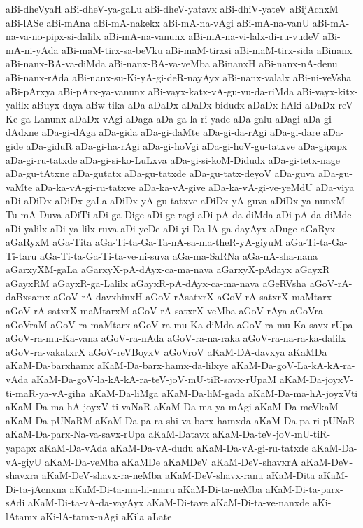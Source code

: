 {aBi-dheVyaH
aBi-dheV-ya-gaLu
aBi-dheV-yatavx
aBi-dhiV-yateV
aBijAcnxM
aBi-lASe
aBi-mAna
aBi-mA-nakekx
aBi-mA-na-vAgi
aBi-mA-na-vanU
aBi-mA-na-va-no-pipx-si-dalilx
aBi-mA-na-vanunx
aBi-mA-na-vi-lalx-di-ru-vudeV
aBi-mA-ni-yAda
aBi-maM-tirx-sa-beVku
aBi-maM-tirxsi
aBi-maM-tirx-sida
aBinanx
aBi-nanx-BA-va-diMda
aBi-nanx-BA-va-veMba
aBinanxH
aBi-nanx-nA-denu
aBi-nanx-rAda
aBi-nanx-su-Ki-yA-gi-deR-nayAyx
aBi-nanx-valalx
aBi-ni-veVsha
aBi-pArxya
aBi-pArx-ya-vanunx
aBi-vayx-katx-vA-gu-vu-da-riMda
aBi-vayx-kitx-yalilx
aBuyx-daya
aBw-tika
aDa
aDaDx
aDaDx-bidudx
aDaDx-hAki
aDaDx-reV-Ke-ga-Lanunx
aDaDx-vAgi
aDaga
aDa-ga-la-ri-yade
aDa-galu
aDagi
aDa-gi-dAdxne
aDa-gi-dAga
aDa-gida
aDa-gi-daMte
aDa-gi-da-rAgi
aDa-gi-dare
aDa-gide
aDa-giduR
aDa-gi-ha-rAgi
aDa-gi-hoVgi
aDa-gi-hoV-gu-tatxve
aDa-gipapx
aDa-gi-ru-tatxde
aDa-gi-si-ko-LuLxva
aDa-gi-si-koM-Didudx
aDa-gi-tetx-nage
aDa-gu-tAtxne
aDa-gutatx
aDa-gu-tatxde
aDa-gu-tatx-deyoV
aDa-guva
aDa-gu-vaMte
aDa-ka-vA-gi-ru-tatxve
aDa-ka-vA-give
aDa-ka-vA-gi-ve-yeMdU
aDa-viya
aDi
aDiDx
aDiDx-gaLa
aDiDx-yA-gu-tatxve
aDiDx-yA-guva
aDiDx-ya-nunxM-Tu-mA-Duva
aDiTi
aDi-ga-Dige
aDi-ge-ragi
aDi-pA-da-diMda
aDi-pA-da-diMde
aDi-yalilx
aDi-ya-lilx-ruva
aDi-yeDe
aDi-yi-Da-lA-ga-dayAyx
aDuge
aGaRyx
aGaRyxM
aGa-Tita
aGa-Ti-ta-Ga-Ta-nA-sa-ma-theR-yA-giyuM
aGa-Ti-ta-Ga-Ti-taru
aGa-Ti-ta-Ga-Ti-ta-ve-ni-suva
aGa-ma-SaRNa
aGa-nA-sha-nana
aGarxyXM-gaLa
aGarxyX-pA-dAyx-ca-ma-nava
aGarxyX-pAdayx
aGayxR
aGayxRM
aGayxR-ga-Lalilx
aGayxR-pA-dAyx-ca-ma-nava
aGeRVsha
aGoV-rA-daBxsamx
aGoV-rA-davxhinxH
aGoV-rAsatxrX
aGoV-rA-satxrX-maMtarx
aGoV-rA-satxrX-maMtarxM
aGoV-rA-satxrX-veMba
aGoV-rAya
aGoVra
aGoVraM
aGoV-ra-maMtarx
aGoV-ra-mu-Ka-diMda
aGoV-ra-mu-Ka-savx-rUpa
aGoV-ra-mu-Ka-vana
aGoV-ra-nAda
aGoV-ra-na-raka
aGoV-ra-na-ra-ka-dalilx
aGoV-ra-vakatxrX
aGoV-reVBoyxV
aGoVroV
aKaM-DA-davxya
aKaMDa
aKaM-Da-barxhamx
aKaM-Da-barx-hamx-da-lilxye
aKaM-Da-goV-La-kA-kA-ra-vAda
aKaM-Da-goV-la-kA-kA-ra-teV-joV-mU-tiR-savx-rUpaM
aKaM-Da-joyxV-ti-maR-ya-vA-giha
aKaM-Da-liMga
aKaM-Da-liM-gada
aKaM-Da-ma-hA-joyxVti
aKaM-Da-ma-hA-joyxV-ti-vaNaR
aKaM-Da-ma-ya-mAgi
aKaM-Da-meVkaM
aKaM-Da-pUNaRM
aKaM-Da-pa-ra-shi-va-barx-hamxda
aKaM-Da-pa-ri-pUNaR
aKaM-Da-parx-Na-va-savx-rUpa
aKaM-Datavx
aKaM-Da-teV-joV-mU-tiR-yapapx
aKaM-Da-vAda
aKaM-Da-vA-dudu
aKaM-Da-vA-gi-ru-tatxde
aKaM-Da-vA-giyU
aKaM-Da-veMba
aKaMDe
aKaMDeV
aKaM-DeV-shavxrA
aKaM-DeV-shavxra
aKaM-DeV-shavx-ra-neMba
aKaM-DeV-shavx-ranu
aKaM-Dita
aKaM-Di-ta-jAcnxna
aKaM-Di-ta-ma-hi-maru
aKaM-Di-ta-neMba
aKaM-Di-ta-parx-sAdi
aKaM-Di-ta-vA-da-vayAyx
aKaM-Di-tave
aKaM-Di-ta-ve-nanxde
aKi-lAtamx
aKi-lA-tamx-nAgi
aKila
aLate
}
